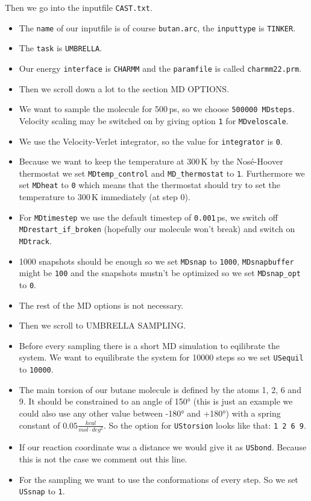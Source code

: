 \documentclass[a4paper,11pt]{scrartcl}
\begin{document}
Then we go into the inputfile \texttt{CAST.txt}.
\begin{itemize}
	\item The \texttt{name} of our inputfile is of course \texttt{butan.arc}, the \texttt{inputtype} is \texttt{TINKER}.
	\item The \texttt{task} is \texttt{UMBRELLA}.
	\item Our energy \texttt{interface} is \texttt{CHARMM} and the \texttt{paramfile} is called \texttt{charmm22.prm}. 
	\item Then we scroll down a lot to the section MD OPTIONS.
	\item We want to sample the molecule for 500\,ps, so we choose \texttt{500000 MDsteps}. Velocity scaling may be switched on by giving option \texttt{1} for \texttt{MDveloscale}.
	\item We use the Velocity-Verlet integrator, so the value for \texttt{integrator} is \texttt{0}.
	\item Because we want to keep the temperature at 300\,K by the Nosé-Hoover thermostat we set \texttt{MDtemp\_control} and \texttt{MD\_thermostat} to \texttt{1}. Furthermore we set \texttt{MDheat} to \texttt{0} which means that the thermostat should try to set the temperature to 300\,K immediately (at step 0).
	\item For \texttt{MDtimestep} we use the default timestep of \texttt{0.001}\,ps, we switch off \texttt{MDrestart\_if\_broken} (hopefully our molecule won't break) and switch on \texttt{MDtrack}.
	\item 1000 snapshots should be enough so we set \texttt{MDsnap} to \texttt{1000}, \texttt{MDsnapbuffer} might be \texttt{100} and the snapshots mustn't be optimized so we set \texttt{MDsnap\_opt} to \texttt{0}.
	\item The rest of the MD options is not necessary.
	\item Then we scroll to UMBRELLA SAMPLING.
	\item Before every sampling there is a short MD simulation to eqilibrate the system. We want to equilibrate the system for 10000 steps so we set \texttt{USequil} to \texttt{10000}. 
	\item The main torsion of our butane molecule is defined by the atoms 1, 2, 6 and 9. It should be constrained to an angle of 150° (this is just an example we could also use any other value between -180° and +180°) with a spring constant of $0.05 \frac{kcal}{mol \cdot deg^2}$. So the option for \texttt{UStorsion} looks like that: \mbox{\texttt{1 2 6 9}}.
	\item If our reaction coordinate was a distance we would give it as \texttt{USbond}. Because this is not the case we comment out this line.
	\item For the sampling we want to use the conformations of every step. So we set \texttt{USsnap} to \texttt{1}.
\end{itemize}
\end{document}
